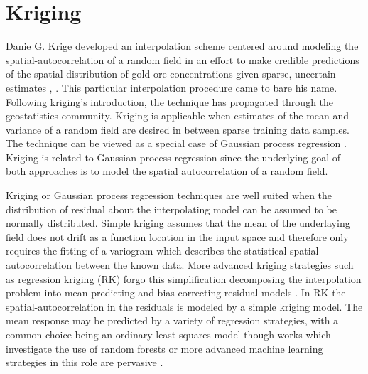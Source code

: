
\section{Kriging}

Danie G. Krige developed an interpolation scheme centered around modeling the spatial-autocorrelation of a random field in an effort to make credible predictions of the spatial distribution of gold ore concentrations given sparse, uncertain estimates \cite{krige51}, \cite{Krige51a}.  This particular interpolation procedure came to bare his name. Following kriging's introduction, the technique has propagated through the geostatistics community.  Kriging is applicable when estimates of the mean and variance of a random field are desired in between sparse training data samples.  The technique can be viewed as a special case of Gaussian process regression \cite{Williams96}.  Kriging is related to Gaussian process regression since the underlying goal of both approaches is to model the spatial autocorrelation of a random field.  

Kriging or Gaussian process regression techniques are well suited when the distribution of residual about the interpolating model can be assumed to be normally distributed.  Simple kriging assumes that the mean of the underlaying field does not drift as a function location in the input space and therefore only requires the fitting of a variogram which describes the statistical spatial autocorrelation between the known data.  More advanced kriging strategies such as regression kriging (RK) forgo this simplification decomposing the interpolation problem into mean predicting and bias-correcting residual models \cite{Hengl07}.  In RK the spatial-autocorrelation in the residuals is modeled by a simple kriging model.  The mean response may be predicted by a variety of regression strategies, with a common choice being an ordinary least squares model though works which investigate the use of random forests or more advanced machine learning strategies in this role are pervasive \cite{LI20111647} \cite{LI2017112}.

